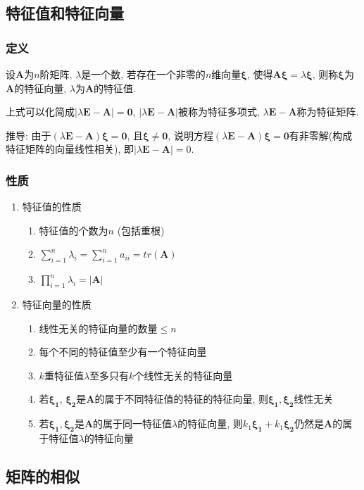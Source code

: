 \subsection{特征值和特征向量}
\subsubsection{定义}
设$ \bm{A} $为$ n $阶矩阵, $ \lambda $是一个数, 若存在一个非零的$ n $维向量$ \bm{\xi} $, 使得$ \bm{A}\bm{\xi}=\lambda \bm{\xi} $, 则称$ \bm{\xi} $为$ \bm{A} $的特征向量, $ \lambda $为$ \bm{A} $的特征值.
\par 上式可以化简成$ \left| \lambda \bm{E}-\bm{A}\right|=\bm{0} $, $ \left| \lambda \bm{E}-\bm{A}\right| $被称为特征多项式, $ \lambda \bm{E}-\bm{A} $称为特征矩阵. \par
推导: 由于$ (\lambda \bm{E} - \bm{A}) \bm{\xi} = \bm{0} $, 且$ \bm{\xi} \neq \bm{0} $, 说明方程$ (\lambda \bm{E} - \bm{A}) \bm{\xi} = \bm{0} $有非零解(构成特征矩阵的向量线性相关), 即$ |\lambda \bm{E} - \bm{A}| = 0 $.
\subsubsection{性质}
\begin{enumerate}
\item 特征值的性质
\begin{enumerate}
\item 特征值的个数为$n$ (包括重根)
\item $ \sum_{i=1}^{n}\lambda_{i}=\sum_{i=1}^{n}a_{ii}=tr(\bm{A}) $
\item $ \prod_{i=1}^{n}\lambda_{i}=\left| \bm{A}\right| $
\end{enumerate}
\item 特征向量的性质
\begin{enumerate}
\item 线性无关的特征向量的数量$\le n$
\item 每个不同的特征值至少有一个特征向量
\item $ k $重特征值$ \lambda $至多只有$ k $个线性无关的特征向量
\item 若$ \bm{\xi_1} $, $ \bm{\xi_2} $是$ \bm{A} $的属于不同特征值的特征的特征向量, 则$ \bm{\xi_1}, \bm{\xi_2} $线性无关
\item 若$ \bm{\xi_1}, \bm{\xi_2} $是$ \bm{A} $的属于同一特征值$ \lambda $的特征向量, 则$ k_1\bm{\xi_1} + k_1\bm{\xi_2} $仍然是$ \bm{A} $的属于特征值$ \lambda $的特征向量
\end{enumerate}
\end{enumerate}
\subsection{矩阵的相似}
